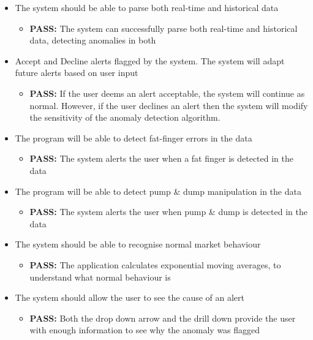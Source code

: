\documentclass[12pt]{article}
\begin{document}
\begin{itemize}
  \item The system should be able to parse both real-time and historical data
      \begin{itemize}
        \item \textbf{PASS:} The system can successfully parse both real-time and historical data, detecting anomalies in both
      \end{itemize}
      \item Accept and Decline alerts flagged by the system. The system will adapt future alerts based on user input
      \begin{itemize}
            \item \textbf{PASS:} If the user deems an alert acceptable, the system will continue as normal.
            However, if the user declines an alert then the system will modify the sensitivity of the anomaly detection algorithm.
      \end{itemize}
      \item The program will be able to detect fat-finger errors in the data
      \begin{itemize}
        \item \textbf{PASS:} The system alerts the user when a fat finger is detected in the data
      \end{itemize}
      \item The program will be able to detect pump \& dump manipulation in the data
      \begin{itemize}
        \item \textbf{PASS:} The system alerts the user when pump \& dump is detected in the data
      \end{itemize}
      \item The system should be able to recognise normal market behaviour
      \begin{itemize}
        \item \textbf{PASS:} The application calculates exponential moving averages, to understand what normal behaviour is
      \end{itemize}
      \item The system should allow the user to see the cause of an alert
      \begin{itemize}
        \item \textbf{PASS:} Both the drop down arrow and the drill down provide the user with enough information to see why the anomaly was flagged
      \end{itemize}

\end{itemize}
\end{document}
